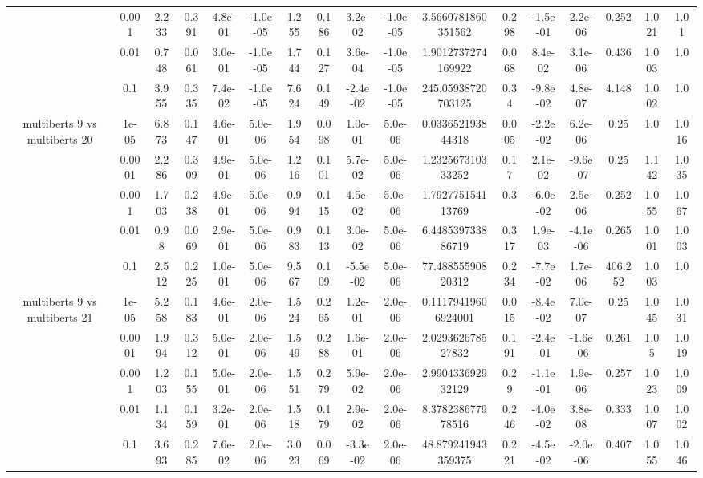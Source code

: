 \begin{tabular}{|c|c|c|c|c|c|c|c|c|c|c|c|c|c|c|c|c|}
 & 0.001 & 2.233 & 0.391 & 4.8e-01 & -1.0e-05 & 1.255 & 0.186 & 3.2e-02 & -1.0e-05 & 3.5660781860351562 & 0.298 & -1.5e-01 & 2.2e-06 & 0.252 & 1.021 & 1.01 \\
 & 0.01 & 0.748 & 0.061 & 3.0e-01 & -1.0e-05 & 1.744 & 0.127 & 3.6e-04 & -1.0e-05 & 1.9012737274169922 & 0.068 & 8.4e-02 & 3.1e-06 & 0.436 & 1.003 & 1.0 \\
 & 0.1 & 3.955 & 0.335 & 7.4e-02 & -1.0e-05 & 7.624 & 0.149 & -2.4e-02 & -1.0e-05 & 245.05938720703125 & 0.34 & -9.8e-02 & 4.8e-07 & 4.148 & 1.002 & 1.0 \\
\hline
\multirow{5}{*}{multiberts 9 vs multiberts 20} & 1e-05 & 6.873 & 0.147 & 4.6e-01 & 5.0e-06 & 1.954 & 0.098 & 1.0e-01 & 5.0e-06 & 0.033652193844318 & 0.005 & -2.2e-02 & 6.2e-06 & 0.25 & 1.0 & 1.016 \\
 & 0.0001 & 2.286 & 0.309 & 4.9e-01 & 5.0e-06 & 1.216 & 0.101 & 5.7e-02 & 5.0e-06 & 1.232567310333252 & 0.17 & 2.1e-02 & -9.6e-07 & 0.25 & 1.142 & 1.035 \\
 & 0.001 & 1.703 & 0.238 & 4.9e-01 & 5.0e-06 & 0.994 & 0.115 & 4.5e-02 & 5.0e-06 & 1.792775154113769 & 0.3 & -6.0e-02 & 2.5e-06 & 0.252 & 1.055 & 1.067 \\
 & 0.01 & 0.98 & 0.069 & 2.9e-01 & 5.0e-06 & 0.983 & 0.113 & 3.0e-02 & 5.0e-06 & 6.448539733886719 & 0.317 & 1.9e-03 & -4.1e-06 & 0.265 & 1.001 & 1.003 \\
 & 0.1 & 2.512 & 0.225 & 1.0e-01 & 5.0e-06 & 9.567 & 0.109 & -5.5e-02 & 5.0e-06 & 77.48855590820312 & 0.234 & -7.7e-02 & 1.7e-06 & 406.252 & 1.003 & 1.0 \\
\hline
\multirow{5}{*}{multiberts 9 vs multiberts 21} & 1e-05 & 5.258 & 0.183 & 4.6e-01 & 2.0e-06 & 1.524 & 0.265 & 1.2e-01 & 2.0e-06 & 0.11179419606924001 & 0.015 & -8.4e-02 & 7.0e-07 & 0.25 & 1.045 & 1.031 \\
 & 0.0001 & 1.994 & 0.312 & 5.0e-01 & 2.0e-06 & 1.549 & 0.288 & 1.6e-01 & 2.0e-06 & 2.029362678527832 & 0.191 & -2.4e-01 & -1.6e-06 & 0.261 & 1.05 & 1.019 \\
 & 0.001 & 1.203 & 0.155 & 5.0e-01 & 2.0e-06 & 1.551 & 0.279 & 5.9e-02 & 2.0e-06 & 2.990433692932129 & 0.29 & -1.1e-01 & 1.9e-06 & 0.257 & 1.023 & 1.009 \\
 & 0.01 & 1.134 & 0.159 & 3.2e-01 & 2.0e-06 & 1.518 & 0.179 & 2.9e-02 & 2.0e-06 & 8.378238677978516 & 0.246 & -4.0e-02 & 3.8e-08 & 0.333 & 1.007 & 1.002 \\
 & 0.1 & 3.693 & 0.285 & 7.6e-02 & 2.0e-06 & 3.023 & 0.069 & -3.3e-02 & 2.0e-06 & 48.879241943359375 & 0.221 & -4.5e-02 & -2.0e-06 & 0.407 & 1.055 & 1.046 \\

\end{tabular}
